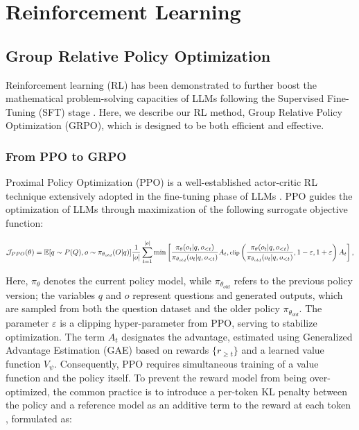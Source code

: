 \section{Reinforcement Learning}

\subsection{Group Relative Policy Optimization}

Reinforcement learning (RL) has been demonstrated to further boost the mathematical problem-solving capacities of LLMs following the Supervised Fine-Tuning (SFT) stage \citep{wang2023math,wizardmath}. Here, we describe our RL method, Group Relative Policy Optimization (GRPO), which is designed to be both efficient and effective.

\subsubsection{From PPO to GRPO}

Proximal Policy Optimization (PPO) \citep{schulman2017proximal} is a well-established actor-critic RL technique extensively adopted in the fine-tuning phase of LLMs \citep{ouyang2022training}. PPO guides the optimization of LLMs through maximization of the following surrogate objective function:

\begin{equation}
\footnotesize
    \mathcal{J}_{PPO}(\theta) = \mathbb{E}{[q \sim P(Q), o \sim \pi_{\theta_{old}}(O|q)]} \frac{1}{|o|} \sum_{t=1}^{|o|} \min \left[ \frac{\pi_\theta(o_{t} | q, o_{<t})}{\pi_{\theta_{old}}(o_{t} | q, o_{<t})} A_{t}, \text{clip} \left( \frac{\pi_\theta(o_{t} | q, o_{<t})}{\pi_{\theta_{old}}(o_{t} | q, o_{<t})}, 1 - \varepsilon, 1 + \varepsilon \right)  A_{t} \right] ,
\end{equation}

Here, $\pi_{\theta}$ denotes the current policy model, while $\pi_{\theta_{old}}$ refers to the previous policy version; the variables $q$ and $o$ represent questions and generated outputs, which are sampled from both the question dataset and the older policy $\pi_{\theta_{old}}$. The parameter $\varepsilon$ is a clipping hyper-parameter from PPO, serving to stabilize optimization. The term $A_t$ designates the advantage, estimated using Generalized Advantage Estimation (GAE) \citep{gae} based on rewards $\{r_{\ge t}\}$ and a learned value function $V_{\psi}$. Consequently, PPO requires simultaneous training of a value function and the policy itself. To prevent the reward model from being over-optimized, the common practice is to introduce a per-token KL penalty between the policy and a reference model as an additive term to the reward at each token \citep{ouyang2022training}, formulated as:

